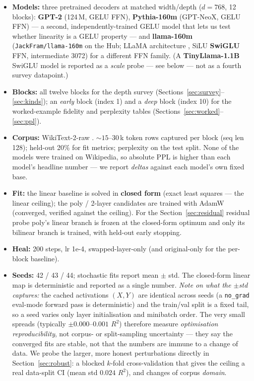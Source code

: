 \documentclass{article}
\begin{document}
\begin{itemize}
\item \textbf{Models:} three pretrained decoders at matched width/depth ($d = 768$, 12
  blocks): \textbf{GPT-2} \citep{radford2019gpt2} (124\,M, GELU FFN), \textbf{Pythia-160m}
  \citep{biderman2023pythia} (GPT-NeoX, GELU FFN) --- a second, independently-trained GELU
  model that lets us test whether linearity is a GELU property --- and \textbf{llama-160m}
  (\texttt{JackFram/llama-160m} on the Hub; LLaMA architecture \citep{touvron2023llama}, SiLU
  \textbf{SwiGLU} FFN, intermediate 3072) for a different FFN family. (A
  \textbf{TinyLlama-1.1B} SwiGLU model is reported as a \emph{scale} probe --- see below ---
  not as a fourth survey datapoint.)
\item \textbf{Blocks:} all twelve blocks for the depth survey (Sections~\ref{sec:survey}--%
  \ref{sec:kinds}); an \emph{early} block (index 1) and a \emph{deep} block (index 10) for the
  worked-example fidelity and perplexity tables (Sections~\ref{sec:worked}--\ref{sec:ppl}).
\item \textbf{Corpus:} WikiText-2-raw \citep{merity2017pointer}. ${\sim}15$--$30$\,k token
  rows captured per block (seq len 128); held-out 20\% for fit metrics; perplexity on the
  test split. None of the models were trained on Wikipedia, so absolute PPL is higher than
  each model's headline number --- we report \emph{deltas} against each model's own fixed base.
\item \textbf{Fit:} the linear baseline is solved in \textbf{closed form} (exact least
  squares --- the linear ceiling); the poly / 2-layer candidates are trained with AdamW
  (converged, verified against the ceiling). For the Section~\ref{sec:residual} residual probe
  poly's linear branch is frozen at the closed-form optimum and only its bilinear branch is
  trained, with held-out early stopping.
\item \textbf{Heal:} 200 steps, lr 1e-4, swapped-layer-only (and original-only for the
  per-block baseline).
\item \textbf{Seeds:} 42 / 43 / 44; stochastic fits report mean $\pm$ std. The closed-form
  linear map is deterministic and reported as a single number. \emph{Note on what the
  $\pm$std captures:} the cached activations $(X, Y)$ are identical across seeds (a
  \texttt{no\_grad} eval-mode forward pass is deterministic) and the train/val split is a
  fixed tail, so a seed varies only layer initialisation and minibatch order. The very small
  spreads (typically $\pm 0.000$--$0.001$ $R^2$) therefore measure \emph{optimisation
  reproducibility}, not corpus- or split-sampling uncertainty --- they say the converged fits
  are stable, not that the numbers are immune to a change of data. We probe the larger, more
  honest perturbations directly in Section~\ref{sec:robust}: a blocked $k$-fold
  cross-validation that gives the ceiling a real data-split CI (mean std $0.024$ $R^2$), and
  changes of corpus \emph{domain}.
\end{itemize}
\end{document}

